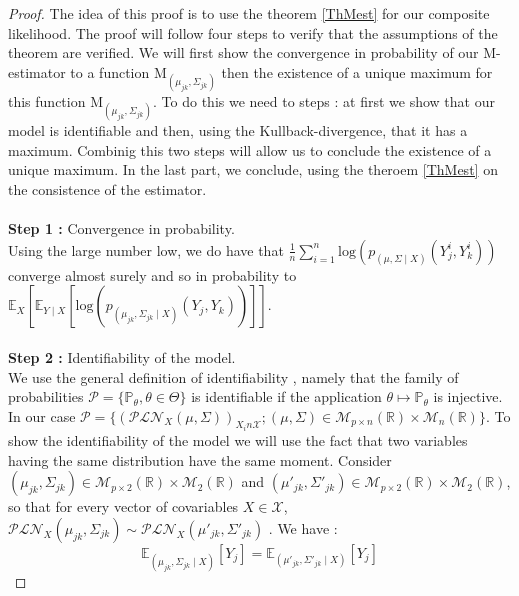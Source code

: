 \documentclass[11pt, a4paper]{article}
\begin{document}
\begin{proof}

The idea of this proof is to use the theorem \ref{ThMest} for our composite likelihood. The proof will  follow four steps to verify that the assumptions of the theorem are verified. We will first show the convergence in probability of our M-estimator to a function $\mathrm{M}_{(\mu_{jk},\Sigma_{jk})}$ then the existence of a unique maximum for this function $\mathrm{M}_{(\mu_{jk},\Sigma_{jk})}$. To do this we need to steps : at first we show that our model is identifiable and then, using the Kullback-divergence, that it has a maximum. Combinig this two steps will allow us to conclude the existence of a unique maximum. In the last part, we conclude, using the theroem \ref{ThMest} on the consistence of the estimator. \\
\\
\textbf{Step 1 :} Convergence in probability.\\
Using the large number low, we do have that $\frac{1}{n} \sum_{i=1}^{n} \mathrm{log}(p_{(\mu,\Sigma \mid X)}(Y^i_j,Y^i_k))$ converge almost surely and so in probability to $\mathbb{E}_X[\mathbb{E}_{Y \mid X}[ \mathrm{log}(p_{(\mu_{jk},\Sigma_{jk} \mid X)}(Y_j,Y_k))]]$.\\
\\
\textbf{Step 2 :} Identifiability of the model.\\
 We use the general definition of identifiability \cite{rivoirard}, namely that the family of probabilities $\mathcal{P}=\{\mathbb{P}_\theta,\theta \in \Theta\}$ is identifiable if the application $ \theta \mapsto \mathbb{P}_\theta$ is injective.
 In our case $\mathcal{P}=\{(\mathcal{PLN}_X (\mu,\Sigma))_{X _in \mathcal{X}}; (\mu, \Sigma) \in  \mathcal{M}_{p\times n}(\mathbb{R}) \times \mathcal{M}_n(\mathbb{R})\}$. To show the identifiability of the model we will use the fact that two variables having the same distribution have the same moment. Consider $(\mu_{jk},\Sigma_{jk}) \in \mathcal{M}_{p\times 2}(\mathbb{R}) \times \mathcal{M}_2(\mathbb{R})$ and $(\mu'_{jk},\Sigma'_{jk}) \in \mathcal{M}_{p\times 2}(\mathbb{R}) \times \mathcal{M}_2(\mathbb{R})$, so that  for every vector of covariables $X \in \mathcal{X}$,$\mathcal{PLN}_X(\mu_{jk},\Sigma_{jk})\sim\mathcal{PLN}_X(\mu'_{jk},\Sigma'_{jk})$ . We have :
 \begin{equation}
 \mathbb{E}_{(\mu_{jk},\Sigma_{jk} \mid X)}[Y_j]=\mathbb{E}_{(\mu'_{jk},\Sigma'_{jk} \mid X)} [Y_j] 
 \end{equation}
\begin{equation}

\end{equation}
\end{proof}
\end{document}
